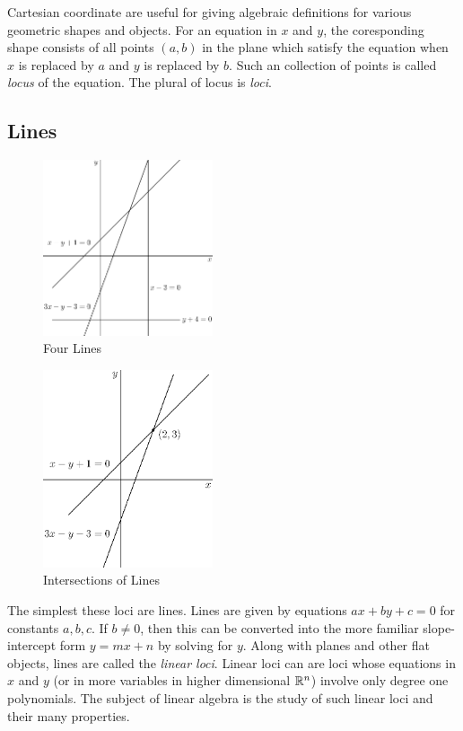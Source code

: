 \documentclass[fleqn]{report}
\begin{document}
Cartesian coordinate are useful for giving
algebraic definitions for various geometric shapes and objects.
For an equation in $x$ and $y$, the coresponding shape consists
of all points $(a,b)$ in the plane which satisfy the equation
when $x$ is replaced by $a$ and $y$ is replaced by $b$. 
Such an collection of points is called \emph{locus} of the
equation. The plural of locus is \emph{loci}.

\subsection{Lines}
\label{lines}

\begin{figure}[t]
\centering
\includegraphics[width=5cm]{figure02.eps}
\caption{Four Lines}
\label{four-lines}
\end{figure}

\begin{figure}[t]
\centering
\includegraphics[width=5cm]{figure22.eps}
\caption{Intersections of Lines}
\label{intersection-of-lines}
\end{figure}

The simplest these loci are lines. Lines are given by
equations $ax + by + c = 0$ for constants $a,b,c$. If $b \neq
0$, then this can be converted into the more familiar
slope-intercept form $y = mx + n$ by solving for $y$. Along
with planes and other flat objects, lines are called the
\emph{linear loci}. Linear loci can are loci whose equations
in $x$ and $y$ (or in more variables in higher dimensional
$\mathbb{R}^n$) involve only degree one polynomials. The subject of
linear algebra is the study of such linear loci and their many
properties.
\end{document}

